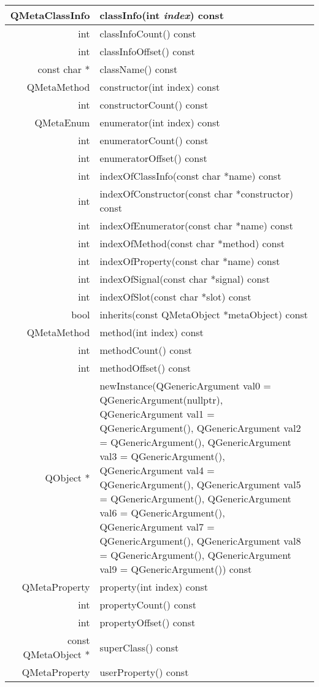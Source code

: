 \begin{longtable}[l]{|r|m{28em}|}   
\hline
QMetaClassInfo	& classInfo(int \emph{index}) const \\ 
\hline
int &	classInfoCount() const \\
\hline
int	&classInfoOffset() const\\
\hline
const char *	&className() const\\
\hline
QMetaMethod	&constructor(int index) const\\
\hline
int	&constructorCount() const\\
\hline
QMetaEnum	&enumerator(int index) const\\
\hline
int	&enumeratorCount() const\\
\hline
int	&enumeratorOffset() const\\
\hline
int&	indexOfClassInfo(const char *name) const\\
\hline
int	&indexOfConstructor(const char *constructor) const\\
\hline
int	&indexOfEnumerator(const char *name) const\\
\hline
int	&indexOfMethod(const char *method) const\\
\hline
int	&indexOfProperty(const char *name) const\\
\hline
int	&indexOfSignal(const char *signal) const\\
\hline
int&	indexOfSlot(const char *slot) const\\
\hline
bool	&inherits(const QMetaObject *metaObject) const\\
\hline
QMetaMethod	&method(int index) const\\
\hline
int	&methodCount() const\\
\hline
int	&methodOffset() const\\
\hline
QObject *	&newInstance(QGenericArgument val0 = QGenericArgument(nullptr), QGenericArgument val1 = QGenericArgument(), QGenericArgument val2 = QGenericArgument(), QGenericArgument val3 = QGenericArgument(), QGenericArgument val4 = QGenericArgument(), QGenericArgument val5 = QGenericArgument(), QGenericArgument val6 = QGenericArgument(), QGenericArgument val7 = QGenericArgument(), QGenericArgument val8 = QGenericArgument(), QGenericArgument val9 = QGenericArgument()) const\\
\hline
QMetaProperty	&property(int index) const\\
\hline
int&	propertyCount() const\\
\hline
int	&propertyOffset() const\\
\hline
const QMetaObject *	&superClass() const\\
\hline
QMetaProperty	&userProperty() const\\
\hline
\end{longtable}



